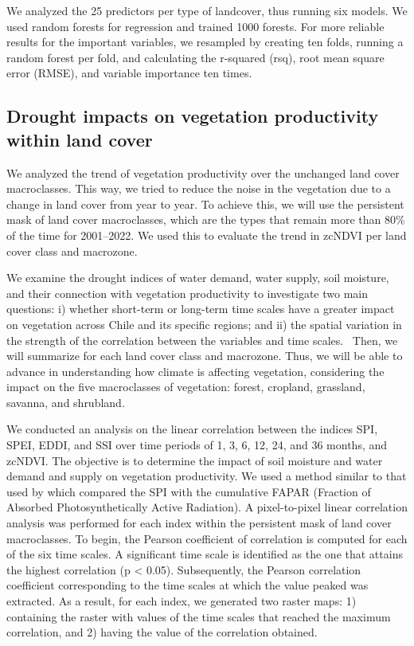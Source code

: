 \documentclass[
  authoryear,
  preprint,
  3p,
  onecolumn]{elsarticle}
\begin{document}
We analyzed the 25 predictors per type of landcover, thus running six
models. We used random forests for regression and trained 1000 forests.
For more reliable results for the important variables, we resampled by
creating ten folds, running a random forest per fold, and calculating
the r-squared (rsq), root mean square error (RMSE), and variable
importance ten times.

\hypertarget{drought-impacts-on-vegetation-productivity-within-land-cover}{%
\subsection{Drought impacts on vegetation productivity within land
cover}\label{drought-impacts-on-vegetation-productivity-within-land-cover}}

We analyzed the trend of vegetation productivity over the unchanged land
cover macroclasses. This way, we tried to reduce the noise in the
vegetation due to a change in land cover from year to year. To achieve
this, we will use the persistent mask of land cover macroclasses, which
are the types that remain more than 80\% of the time for 2001--2022. We
used this to evaluate the trend in zcNDVI per land cover class and
macrozone.

We examine the drought indices of water demand, water supply, soil
moisture, and their connection with vegetation productivity to
investigate two main questions: i) whether short-term or long-term time
scales have a greater impact on vegetation across Chile and its specific
regions; and ii) the spatial variation in the strength of the
correlation between the variables and time scales.~ Then, we will
summarize for each land cover class and macrozone. Thus, we will be able
to advance in understanding how climate is affecting vegetation,
considering the impact on the five macroclasses of vegetation: forest,
cropland, grassland, savanna, and shrubland.

We conducted an analysis on the linear correlation between the indices
SPI, SPEI, EDDI, and SSI over time periods of 1, 3, 6, 12, 24, and 36
months, and zcNDVI. The objective is to determine the impact of soil
moisture and water demand and supply on vegetation productivity. We used
a method similar to that used by \citet{Meroni2017} which compared the
SPI with the cumulative FAPAR (Fraction of Absorbed Photosynthetically
Active Radiation). A pixel-to-pixel linear correlation analysis was
performed for each index within the persistent mask of land cover
macroclasses. To begin, the Pearson coefficient of correlation is
computed for each of the six time scales. A significant time scale is
identified as the one that attains the highest correlation (p
\textless{} 0.05). Subsequently, the Pearson correlation coefficient
corresponding to the time scales at which the value peaked was
extracted. As a result, for each index, we generated two raster maps: 1)
containing the raster with values of the time scales that reached the
maximum correlation, and 2) having the value of the correlation
obtained.
\end{document}
